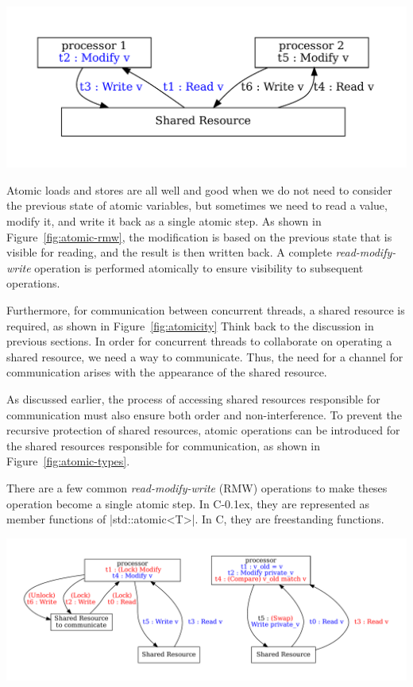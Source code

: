 \documentclass[fontsize=10pt, oneside]{scrartcl}
\newcommand{\cplusplus}[1]{C\kern-0.1ex\raisebox{0.15ex}{\texttt{++}}}
\newcommand{\clang}[1]{C}
\newcommand{\fig}[1]{Figure~\ref{#1}}
\newcommand{\introduce}[1]{\textit{#1}}
\begin{document}
\includegraphics[keepaspectratio, width=0.6\linewidth]{images/atomic-rmw}
\label{fig:atomic-rmw}

Atomic loads and stores are all well and good when we do not need to consider the previous state of atomic variables, but sometimes we need to read a value, modify it, and write it back as a single atomic step.
As shown in \fig{fig:atomic-rmw}, the modification is based on the previous state that is visible for reading, and the result is then written back.
A complete \introduce{read-modify-write} operation is performed atomically to ensure visibility to subsequent operations.
  
Furthermore, for communication between concurrent threads, a shared resource is required, as shown in \fig{fig:atomicity} 
Think back to the discussion in previous sections. 
In order for concurrent threads to collaborate on operating a shared resource, we need a way to communicate. 
Thus, the need for a channel for communication arises with the appearance of the shared resource.

As discussed earlier, the process of accessing shared resources responsible for communication must also ensure both order and non-interference. 
To prevent the recursive protection of shared resources, 
atomic operations can be introduced for the shared resources responsible for communication, as shown in \fig{fig:atomic-types}.

There are a few common \introduce{read-modify-write} (\textsc{RMW}) operations to make theses operation become a single atomic step.
In \cplusplus{}, they are represented as member functions of \cpp|std::atomic<T>|.
In \clang{}, they are freestanding functions.

\includegraphics[keepaspectratio, width=1\linewidth]{images/atomic-types}
\label{fig:atomic-types}
\end{document}
